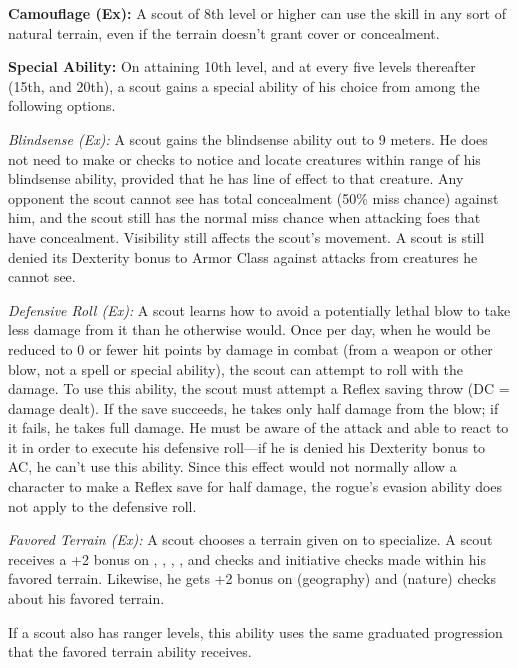 \textbf{Camouflage (Ex):} A scout of 8th level or higher can use the  skill in any sort of natural terrain, even if the terrain doesn't grant cover or concealment.


\textbf{Special Ability:} On attaining 10th level, and at every five levels thereafter (15th, and 20th), a scout gains a special ability of his choice from among the following options.

\textit{Blindsense (Ex):} A scout gains the blindsense ability out to 9 meters. He does not need to make  or  checks to notice and locate creatures within range of his blindsense ability, provided that he has line of effect to that creature. Any opponent the scout cannot see has total concealment (50\% miss chance) against him, and the scout still has the normal miss chance when attacking foes that have concealment. Visibility still affects the scout's movement. A scout is still denied its Dexterity bonus to Armor Class against attacks from creatures he cannot see.

\textit{Defensive Roll (Ex):} A scout learns how to avoid a potentially lethal blow to take less damage from it than he otherwise would. Once per day, when he would be reduced to 0 or fewer hit points by damage in combat (from a weapon or other blow, not a spell or special ability), the scout can attempt to roll with the damage. To use this ability, the scout must attempt a Reflex saving throw (DC = damage dealt). If the save succeeds, he takes only half damage from the blow; if it fails, he takes full damage. He must be aware of the attack and able to react to it in order to execute his defensive roll---if he is denied his Dexterity bonus to AC, he can't use this ability. Since this effect would not normally allow a character to make a Reflex save for half damage, the rogue's evasion ability does not apply to the defensive roll.

\textit{Favored Terrain (Ex):} A scout chooses a terrain given on  to specialize. A scout receives a +2 bonus on , , , ,  and  checks and initiative checks made within his favored terrain. Likewise, he gets +2 bonus on  (geography) and  (nature) checks about his favored terrain.

If a scout also has ranger levels, this ability uses the same graduated progression that the favored terrain ability receives.

